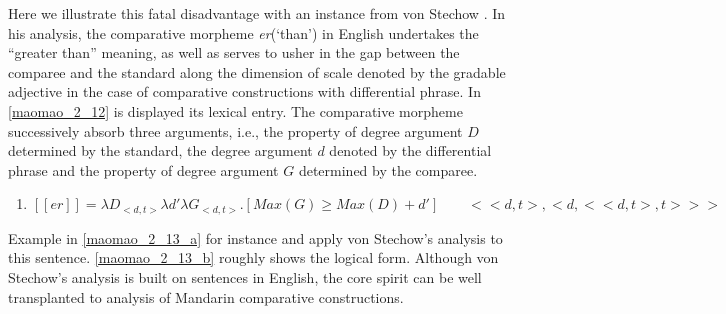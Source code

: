 \documentclass{ctexart}
\let \cite \parencite
\begin{document}
Here we illustrate this fatal disadvantage with an instance from von Stechow \cite{von1984a}. In his analysis, the comparative morpheme \textit{er}(`than') in English undertakes the ``greater than'' meaning, as well as serves to usher in the gap between the comparee and the standard along the dimension of scale denoted by the gradable adjective in the case of comparative constructions with differential phrase. In \ref{maomao_2_12} is displayed its lexical entry. The comparative morpheme successively absorb three arguments, i.e., the property of degree argument $D$ determined by the standard, the degree argument $d$ denoted by the differential phrase and  the property of degree argument $G$ determined by the comparee.

\begin{enumerate}
    \item \label{maomao_2_12}
    $[\![er]\!] = \lambda D_{<d,t>} \lambda d' \lambda G_{<d,t>} . [Max(G) \geq Max(D) + d'] \qquad <<d,t>,<d,<<d,t>,t>>>$
\end{enumerate}

Example in \ref{maomao_2_13_a} for instance and apply von Stechow's analysis to this sentence. \ref{maomao_2_13_b} roughly shows the logical form. Although von Stechow's analysis is built on sentences in English, the core spirit can be well transplanted to analysis of Mandarin comparative constructions.
\end{document}
